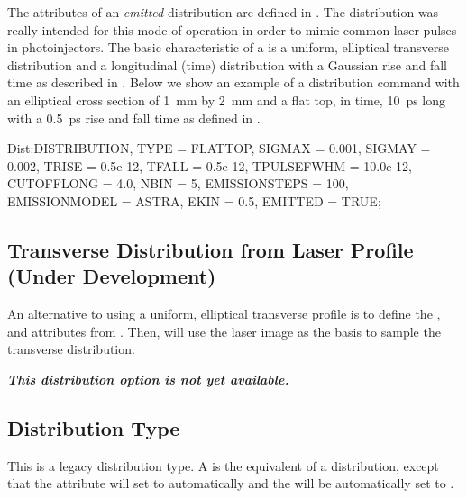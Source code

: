 The attributes of an \emph{emitted}  distribution are defined in .
The  distribution was really intended for this mode of operation in order to mimic
common laser pulses in photoinjectors. The basic characteristic of a  is a uniform, elliptical transverse distribution
and a longitudinal (time) distribution with a Gaussian rise and fall time as described in .
Below we show an example of a  distribution command with an elliptical cross section of \SI{1}{\milli\meter} by \SI{2}{\milli\meter} and a flat top,
in time, \SI{10}{\pico\second} long with a \SI{0.5}{\pico\second} rise and fall time as defined in .

\begin{example}
Dist:DISTRIBUTION, TYPE = FLATTOP,
                   SIGMAX = 0.001,
                   SIGMAY = 0.002,
                   TRISE = 0.5e-12,
                   TFALL = 0.5e-12,
                   TPULSEFWHM = 10.0e-12,
                   CUTOFFLONG = 4.0,
                   NBIN = 5,
                   EMISSIONSTEPS = 100,
                   EMISSIONMODEL = ASTRA,
                   EKIN = 0.5,
                   EMITTED = TRUE;
\end{example}

\subsection{Transverse Distribution from Laser Profile (Under Development)}
An alternative to using a uniform, elliptical transverse profile is to define the ,  and
 attributes from . Then, \opalt will use the laser image as the basis
to sample the transverse distribution.

\textbf{\emph{This distribution option is not yet available.}}


\subsection{ Distribution Type}
\label{sec:gungaussflattopthdisttype}
This is a legacy distribution type. A  is the equivalent of a  distribution, except that
the  attribute will set to  automatically and the  will be automatically set
to .

